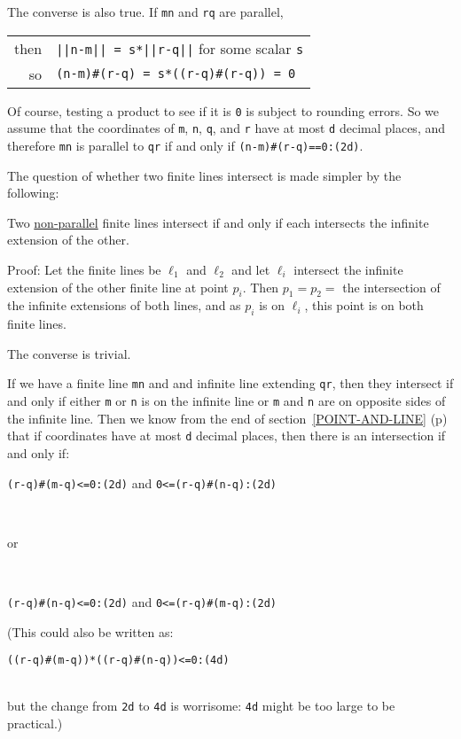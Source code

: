 \documentclass[12pt]{article}
\begin{document}
The converse is also true.  If {\tt mn} and {\tt rq} are parallel, \\
\hspace*{0.3in}\begin{tabular}{r@{~~}l}
then    & {\tt ||n-m|| = s*||r-q||} for some scalar {\tt s} \\
so      & \tt (n-m)\#(r-q) = s*((r-q)\#(r-q)) = 0 \\
        \end{tabular}

Of course, testing a product to see if it is {\tt 0} is subject to
rounding errors.  So we assume that the coordinates of {\tt m},
{\tt n}, {\tt q}, and {\tt r} have at most {\tt d} decimal places,
and therefore {\tt mn} is parallel to {\tt qr} if and only if
{\tt (n-m)\#(r-q)==0:(2d)}.

The question of whether two finite lines intersect is made
simpler by the following:
\begin{lemma}
Two \underline{non-parallel} finite lines intersect
if and only if each intersects the infinite extension of the other.
\end{lemma}
\begin{indpar}{0.3in}
Proof: Let the finite lines be $\ell_1$ and $\ell_2$ and let
$\ell_i$ intersect the infinite extension of the other finite line
at point $p_i$.  Then $p_1=p_2=$ the intersection of the infinite
extensions of both lines, and as $p_i$ is on $\ell_i$, this point is
on both finite lines.

The converse is trivial.
\end{indpar}

If we have a finite line {\tt mn} and and infinite line extending
{\tt qr}, then they intersect if and only if either {\tt m} or {\tt n}
is on the infinite line or {\tt m} and {\tt n} are on opposite sides
of the infinite line.  Then we know from the end of
section~\ref{POINT-AND-LINE} (p\pageref{POINT-AND-LINE}) that
if coordinates have at most {\tt d} decimal places, then
there is an intersection if and only if:\\
\centerline{{\tt (r-q)\#(m-q)<=0:(2d)} and {\tt 0<=(r-q)\#(n-q):(2d)}} \\
\centerline{or} \\
\centerline{{\tt (r-q)\#(n-q)<=0:(2d)} and {\tt 0<=(r-q)\#(m-q):(2d)}}

(This could also be written as: \\
\centerline{{\tt ((r-q)\#(m-q))*((r-q)\#(n-q))<=0:(4d)}} \\
but the change from {\tt 2d} to {\tt 4d} is worrisome: {\tt 4d} might
be too large to be practical.)
\end{document}
